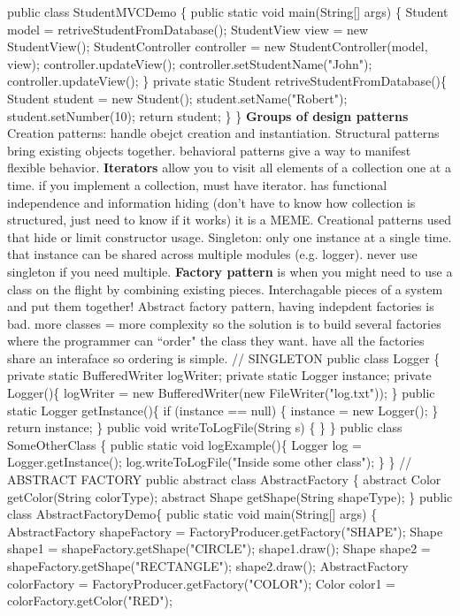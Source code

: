 \documentclass[10pt]{article}
\begin{document}
\begin{landscape}
\begin{multicols*}{6}
public class StudentMVCDemo \{
public static void main(String[] args) \{
Student model  = retriveStudentFromDatabase();
StudentView view = new StudentView();
StudentController controller = new StudentController(model, view);
controller.updateView();
controller.setStudentName("John");
controller.updateView();
\}
private static Student retriveStudentFromDatabase()\{
Student student = new Student();
student.setName("Robert");
student.setNumber(10);
return student;
\}
\}
\textbf{Groups of design patterns}
Creation patterns: handle obejct creation and instantiation. Structural patterns bring existing objects together. behavioral patterns give a way to manifest flexible behavior. \textbf{Iterators} allow you to visit all elements of a collection one at a time. if you implement a collection, must have iterator. has functional independence and information hiding (don't have to know how collection is structured, just need to know if it works) it is a MEME. Creational patterns used that hide or limit constructor usage. Singleton: only one instance at a single time. that instance can be shared across multiple modules (e.g. logger). never use singleton if you need multiple. \textbf{Factory pattern} is when you might need to use a class on the flight by combining existing pieces. Interchagable pieces of a system and put them together! Abstract factory pattern, having indepdent factories is bad. more classes = more complexity so the solution is to build several factories where the programmer can ``order" the class they want. have all the factories share an interaface so ordering is simple.
// SINGLETON
public class Logger \{
private static BufferedWriter logWriter;
private static Logger instance;
private Logger()\{
logWriter = new BufferedWriter(new FileWriter("log.txt"));
\}
public static Logger getInstance()\{
if (instance == null) \{
instance = new Logger();
\}
return instance;
\}
public void writeToLogFile(String s) \{
\}
\}
public class SomeOtherClass \{
public static void logExample()\{
Logger log = Logger.getInstance();
log.writeToLogFile("Inside some other class");
\}
\}
// ABSTRACT FACTORY
public abstract class AbstractFactory \{
abstract Color getColor(String colorType);
abstract Shape getShape(String shapeType);
\}
public class AbstractFactoryDemo\{
public static void main(String[] args) \{
AbstractFactory shapeFactory = FactoryProducer.getFactory("SHAPE");
Shape shape1 = shapeFactory.getShape("CIRCLE");
shape1.draw();
Shape shape2 = shapeFactory.getShape("RECTANGLE");
shape2.draw();
AbstractFactory colorFactory = FactoryProducer.getFactory("COLOR");
Color color1 = colorFactory.getColor("RED");

\end{multicols*}
\end{landscape}
\end{document}
